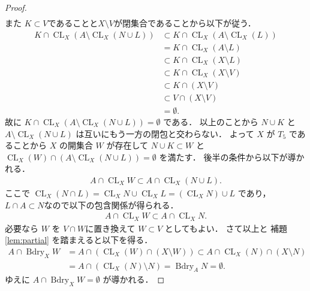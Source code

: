 \documentclass[leqno, a4paper, 12pt]{jsarticle}
\theoremstyle{plain}
\theoremstyle{definition}
\theoremstyle{remark}
\DeclareMathOperator{\bd}{\mathrm{Bdry}}
\DeclareMathOperator{\cl}{\mathrm{CL}}
\numberwithin{equation}{section}
\begin{document}
\begin{proof}
\begin{align*}
\end{align*}
また
$K\subset V$であることと$X\setminus V$が閉集合であることから以下が従う．
\begin{align*}
K\cap 
\cl_{X}(A\setminus \cl_{X}(N\cup L))
&\subset K\cap \cl_{X}(A\setminus \cl_{X}(L))\\
&=
K\cap \cl_{X}(A\setminus L)\\
&\subset K\cap \cl_{X}(X\setminus L)\\
&\subset K\cap \cl_{X}(X\setminus V)\\
&\subset K\cap (X\setminus V)\\
&\subset V\cap (X\setminus V)\\
&=\emptyset. 
\end{align*}
故に
$K\cap 
\cl_{X}(A\setminus \cl_{X}(N\cup L))
=\emptyset$
である．
以上のことから
$N\cup K$
と
$A\setminus \cl_{X}(N\cup L)$
は互いにもう一方の閉包と交わらない．
よって
$X$
が
$T_{5}$
であることから
$X$
の開集合
$W$
が存在して
$N\cup K\subset W$
と
$\cl_{X}(W)\cap (A\setminus \cl_{X}(N\cup L))=\emptyset$
を満たす．
後半の条件から以下が導かれる．
\begin{align}
A\cap \cl_{X}W\subset A\cap \cl_{X}(N\cup L). 
\end{align}
ここで
$\cl_{X}(N\cap L)=\cl_{X}N\cup \cl_{X}L=(\cl_{X}N)\cup L$
であり，
$L\cap A\subset N$なので以下の包含関係が得られる．
\begin{align}
A\cap \cl_{X}W\subset A\cap \cl_{X}N.
\end{align}
必要なら
$W$
を
$V\cap W$に置き換えて
$W\subset V$
としてもよい．
さて以上と
補題 
\ref{lem:partial}
を踏まえると以下を得る．
\begin{align*}
A\cap 
\bd_{X} W
&=
A\cap (\cl_{X}(W)\cap (X\setminus W))
\subset 
A\cap \cl_{X}(N)\cap (X\setminus N)
\\
&=A\cap (\cl_{X}(N)\setminus N)
=\bd_{A}N=\emptyset. 
\end{align*}
ゆえに
$A\cap \bd_{X} W=\emptyset$
が導かれる．
\end{proof}
\end{document}
